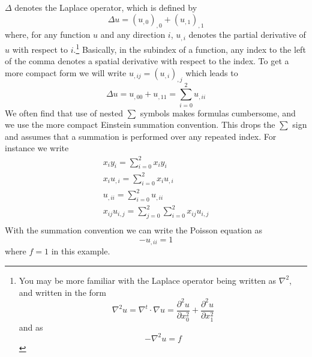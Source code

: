 $\Delta$ denotes the Laplace operator, which is defined by
\begin{equation}
\Delta u = (u_{,0})_{,0}+(u_{,1})_{,1}
\label{eq:FirstSteps.1.1}
\end{equation}
where, for any function $u$ and any direction $i$, $u_{,i}$
denotes the partial derivative  of $u$ with respect
to $i$.\footnote{You may be more familiar with the Laplace
operator being written as $\nabla^2$, and written in
the form
\begin{equation*}
    \nabla^2 u = \nabla^t \cdot \nabla u =  \frac{\partial^2 u}{\partial x_0^2} 
    + \frac{\partial^2 u}{\partial  x_1^2}
\end{equation*}
and  as
\begin{equation*}
    -\nabla^2 u = f
\end{equation*}
}
Basically, in the subindex of a function, any index to the left of the comma denotes a spatial derivative with respect 
to the index. To get a more compact form we will write $u_{,ij}=(u_{,i})_{,j}$
which leads to
\begin{equation}
\Delta u = u_{,00}+u_{,11}=\sum_{i=0}^2 u_{,ii}
\label{eq:FirstSteps.1.1b}
\end{equation}
We often find that use
of nested $\sum$ symbols makes formulas cumbersome, and we use the more
compact Einstein summation convention. This 
drops the $\sum$ sign and assumes that a summation is performed over any repeated index.
For instance we write
\begin{eqnarray}
x_{i}y_{i}=\sum_{i=0}^2 x_{i}y_{i}   \\
x_{i}u_{,i}=\sum_{i=0}^2 x_{i}u_{,i}   \\
u_{,ii}=\sum_{i=0}^2 u_{,ii} \\
x_{ij}u_{i,j}=\sum_{j=0}^2\sum_{i=0}^2 x_{ij}u_{i,j}   \\
\label{eq:FirstSteps.1.1c}
\end{eqnarray}
With the summation convention we can write the Poisson equation  as
\begin{equation}
- u_{,ii} =1 
\label{eq:FirstSteps.1.sum}
\end{equation}
where $f=1$ in this example.

